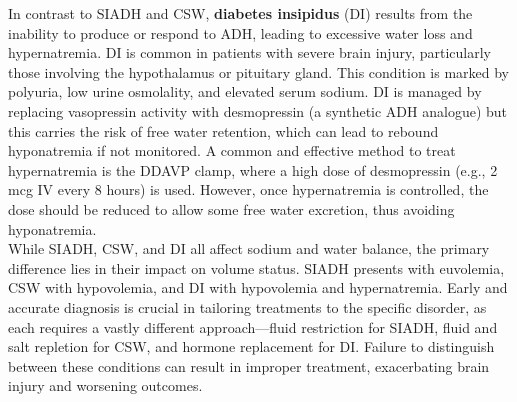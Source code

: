 In contrast to SIADH and CSW, \textbf {diabetes insipidus} (DI) results from the inability to produce or respond to ADH, leading to excessive water loss and hypernatremia. DI is common in patients with severe brain injury, particularly those involving the hypothalamus or pituitary gland. This condition is marked by polyuria, low urine osmolality, and elevated serum sodium. DI is managed by replacing vasopressin activity with desmopressin (a synthetic ADH analogue) but this  carries the risk of free water retention, which can lead to rebound hyponatremia if not  monitored. A common and effective method to treat hypernatremia is the DDAVP clamp, where a high dose of desmopressin (e.g., 2 mcg IV every 8 hours) is used. However, once hypernatremia is controlled, the dose should be reduced to allow some free water excretion, thus avoiding hyponatremia\cite{macmillanDesmopressinPreventRapid2015}.\\

While SIADH, CSW, and DI all affect sodium and water balance, the primary difference lies in their impact on volume status. SIADH presents with euvolemia, CSW with hypovolemia, and DI with hypovolemia and hypernatremia. Early and accurate diagnosis is crucial in tailoring treatments to the specific disorder, as each requires a vastly different approach—fluid restriction for SIADH, fluid and salt repletion for CSW, and hormone replacement for DI. Failure to distinguish between these conditions can result in improper treatment, exacerbating brain injury and worsening outcomes.